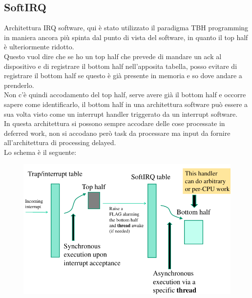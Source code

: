 \documentclass[12pt, oneside]{extbook}
\begin{document}
\subsection{SoftIRQ}
Architettura IRQ software, qui è stato utilizzato il paradigma TBH programming in maniera ancora più spinta dal punto di vista del software, in quanto il top half è ulteriormente ridotto.\\Questo vuol dire che se ho un top half che prevede di mandare un ack al dispositivo e di registrare il bottom half nell'apposita tabella, posso evitare di registrare il bottom half se questo è già presente in memoria e so dove andare a prenderlo.\\Non c'è quindi accodamento del top half, serve avere già il bottom half e occorre sapere come identificarlo, il bottom half in una architettura software può essere a sua volta visto come un interrupt handler triggerato da un interrupt software.\\In questa architettura si possono sempre accodare delle cose processate in deferred work, non si accodano però task da processare ma input da fornire all'architettura di processing delayed.\\Lo schema è il seguente:
\begin{figure}[!h]
	\includegraphics[scale=0.3]{immagini/softirq_architecture.png}
\end{figure}
\end{document}
